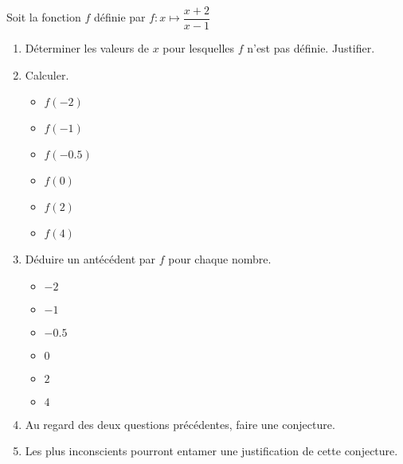 \begin{exercice}
    Soit la fonction $f$ définie par $f:x\longmapsto\dfrac{x+2}{x-1}$
    \begin{enumerate}
        \item Déterminer les valeurs de $x$ pour lesquelles $f$ n'est pas définie. Justifier.
        \item Calculer.
        \vspace*{-3mm}
        \begin{multicols}{3}
            \begin{itemize}
                \item $f(-2)$
                \item $f(-1)$
                \item $f(\num{-0.5})$
                \item $f(0)$
                \item $f(2)$
                \item $f(4)$
            \end{itemize}               
        \end{multicols}
        \item Déduire un antécédent par $f$ pour chaque nombre.
        \vspace*{-3mm}
        \begin{multicols}{3}
            \begin{itemize}
                \item $-2$
                \item $-1$
                \item $\num{-0.5}$
                \item $0$
                \item $2$
                \item $4$
            \end{itemize}               
        \end{multicols}
        \item Au regard des deux questions précédentes, faire une conjecture.
        \item Les plus inconscients pourront entamer une justification de cette conjecture.
    \end{enumerate}    
\end{exercice}
